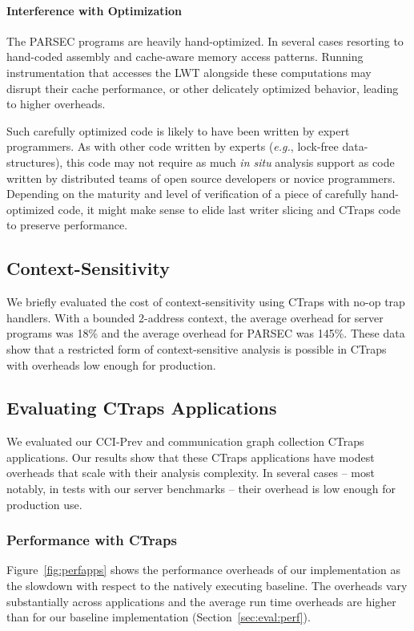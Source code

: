\documentclass[preprint,9pt]{sigplanconf}
\newcommand{\ctraps}{CTraps\xspace}
\newcommand{\lwt}{LWT\xspace}
\begin{document}
\paragraph{Interference with Optimization}
The PARSEC programs are heavily hand-optimized. In several cases
resorting to hand-coded assembly and cache-aware memory access patterns.
Running instrumentation that accesses the \lwt alongside these computations may
disrupt their cache performance, or other delicately optimized behavior,
leading to higher overheads.  

Such carefully optimized code is likely to have been written by expert
programmers.  As with other code written by experts ({\em e.g.}, lock-free
data-structures), this code may not require as much {\em in situ} analysis
support as code written by distributed teams of open source developers or
novice programmers.  Depending on the maturity and level of verification of a
piece of carefully hand-optimized code, it might make sense to elide 
last writer slicing and \ctraps code to preserve performance. 
 

\subsection{Context-Sensitivity}
We briefly evaluated the cost of context-sensitivity using \ctraps with no-op
trap handlers.  With a bounded 2-address context, the average overhead for
server programs was 18\% and the average overhead for PARSEC was 145\%.  These
data show that a restricted form of context-sensitive analysis is possible in
\ctraps with overheads low enough for production.  


\subsection{Evaluating CTraps Applications}
\label{sec:appperf}
We evaluated our CCI-Prev and communication graph collection CTraps
applications.  Our results show that these CTraps applications have modest
overheads that scale with their analysis complexity.  In several cases -- most
notably, in tests with our server benchmarks -- their overhead is low enough
for production use.  

\subsubsection{Performance with \ctraps}

 Figure~\ref{fig:perfapps} shows the performance overheads of
our implementation as the slowdown with respect to the natively executing
baseline.  The overheads vary substantially across applications and the average
run time overheads are higher than for our baseline implementation
(Section~\ref{sec:eval:perf}). 
  
\end{document}
